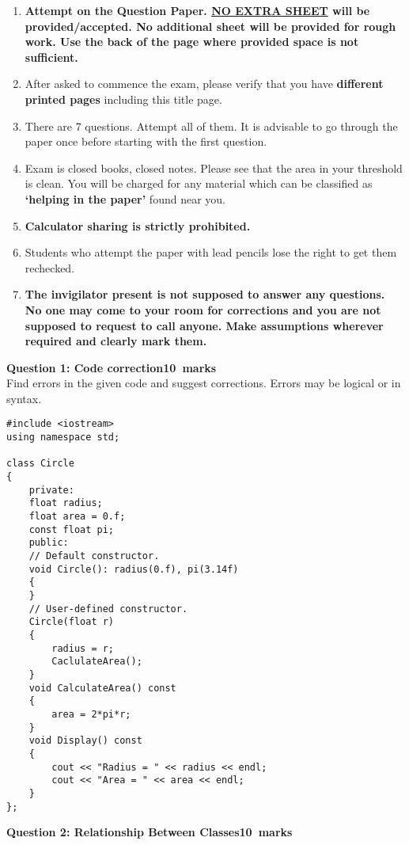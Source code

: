 \documentclass[12pt,a4paper]{article}
\def\QOne{10}
\def\Qtwo{10}
\begin{document}
\begin{enumerate}
\item \textbf{Attempt on the Question Paper. \underline{NO EXTRA SHEET} will be provided/accepted. No
additional sheet will be provided for rough work. Use the back of the page where
provided space is not sufficient.}
\item After asked to commence the exam, please verify that you have \textbf{\pageref{LastPage} different
printed pages} including this title page.
\item There are 7 questions. Attempt all of them. It is advisable to go through the paper once
before starting with the first question.
\item Exam is closed books, closed notes. Please see that the area in your threshold is clean.
You will be charged for any material which can be classified as \textbf{`helping in the paper'}
found near you.
\item \textbf{Calculator sharing is strictly prohibited.}
\item Students who attempt the paper with lead pencils lose the right to get them rechecked.
\item \textbf{The invigilator present is not supposed to answer any questions. No one may come
to your room for corrections and you are not supposed to request to call anyone.
Make assumptions wherever required and clearly mark them.}
\end{enumerate}
\newpage
\noindent\textbf{Question 1: Code correction\hfill \QOne~marks}\\
Find errors in the given code and suggest corrections. Errors may be logical or in syntax.
\begin{lstlisting}
#include <iostream>
using namespace std;

class Circle
{
	private:
	float radius;
	float area = 0.f;
	const float pi;
	public:
	// Default constructor.
	void Circle(): radius(0.f), pi(3.14f)
	{
	}
	// User-defined constructor.
	Circle(float r)
	{
		radius = r;
		CaclulateArea();
	}
	void CalculateArea() const
	{
		area = 2*pi*r;
	}
	void Display() const
	{
		cout << "Radius = " << radius << endl;
		cout << "Area = " << area << endl;
	}
};
\end{lstlisting}
\begin{figure}[H]
\end{figure}
\noindent \textbf{Question 2: Relationship Between Classes\hfill \Qtwo~marks}\\
\end{document}
